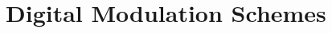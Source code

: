 \documentclass[../course]{subfiles}
\begin{document}
\chapter{Digital Modulation Schemes}


\end{document}
